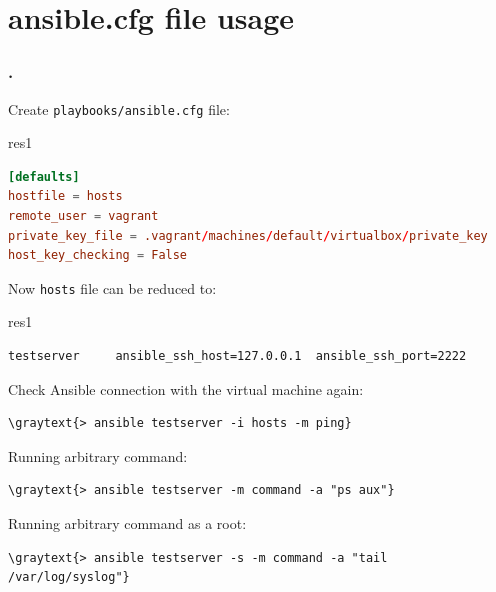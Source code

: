 \documentclass[pdf, 8pt, unicode, t]{beamer} %
\newcommand{\graytext}[1]{{\usebeamercolor[fg]{graytext_color}#1}}
\newcommand{\frametitlesection}{\frametitle{\thesection. \secname}}
\newcommand\Switchsubsection{0}
\begin{document}
\section{ansible.cfg file usage }
\begin{frame}[fragile]
\frametitlesection
Create \verb|playbooks/ansible.cfg| file:

\hspace{1em}
\begin{beamercolorbox}[wd=0.75\textwidth,sep=-0.5em,rounded=true,shadow=true,center]{res1}
\begin{lstlisting}[language=conf]
[defaults]
hostfile = hosts
remote_user = vagrant
private_key_file = .vagrant/machines/default/virtualbox/private_key
host_key_checking = False
\end{lstlisting}
\end{beamercolorbox}

\vspace{2em}
Now \verb|hosts| file can be reduced to:

\hspace{1em}
\begin{beamercolorbox}[wd=0.75\textwidth,sep=-0.5em,rounded=true,shadow=true,center]{res1}
\small
\begin{Verbatim}
testserver     ansible_ssh_host=127.0.0.1  ansible_ssh_port=2222
\end{Verbatim}
\end{beamercolorbox}

\vspace{1.5em}
\normalsize
Check Ansible connection with the virtual machine again:
\begin{Verbatim}[commandchars=\\\{\}]
\graytext{> ansible testserver -i hosts -m ping}
\end{Verbatim}

\vspace{1em}
Running arbitrary command:
\begin{Verbatim}[commandchars=\\\{\}]
\graytext{> ansible testserver -m command -a "ps aux"}
\end{Verbatim}

\vspace{1em}
Running arbitrary command as a root:
\begin{Verbatim}[commandchars=\\\{\}]
\graytext{> ansible testserver -s -m command -a "tail /var/log/syslog"}
\end{Verbatim}
\end{frame}
\renewcommand\Switchsubsection{1}
\end{document}
